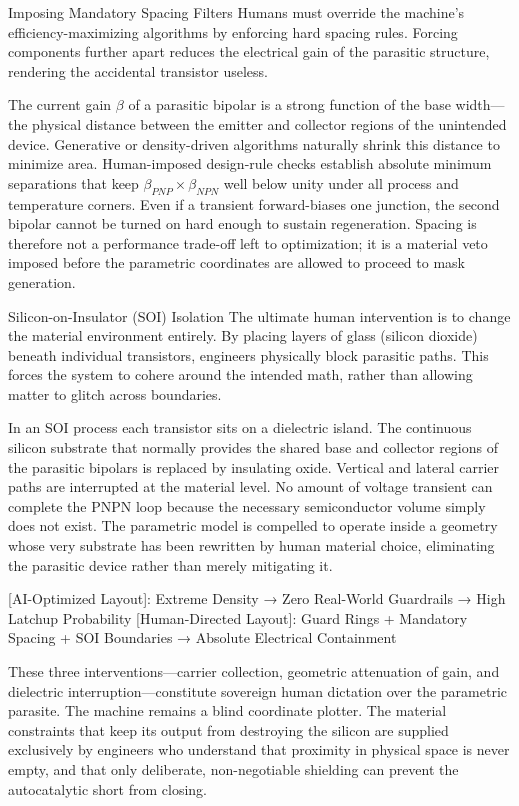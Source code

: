 Imposing Mandatory Spacing Filters  
Humans must override the machine’s efficiency-maximizing algorithms by enforcing hard spacing rules. Forcing components further apart reduces the electrical gain of the parasitic structure, rendering the accidental transistor useless.  

The current gain \(\beta\) of a parasitic bipolar is a strong function of the base width—the physical distance between the emitter and collector regions of the unintended device. Generative or density-driven algorithms naturally shrink this distance to minimize area. Human-imposed design-rule checks establish absolute minimum separations that keep \(\beta_{PNP} \times \beta_{NPN}\) well below unity under all process and temperature corners. Even if a transient forward-biases one junction, the second bipolar cannot be turned on hard enough to sustain regeneration. Spacing is therefore not a performance trade-off left to optimization; it is a material veto imposed before the parametric coordinates are allowed to proceed to mask generation.

Silicon-on-Insulator (SOI) Isolation  
The ultimate human intervention is to change the material environment entirely. By placing layers of glass (silicon dioxide) beneath individual transistors, engineers physically block parasitic paths. This forces the system to cohere around the intended math, rather than allowing matter to glitch across boundaries.  

In an SOI process each transistor sits on a dielectric island. The continuous silicon substrate that normally provides the shared base and collector regions of the parasitic bipolars is replaced by insulating oxide. Vertical and lateral carrier paths are interrupted at the material level. No amount of voltage transient can complete the PNPN loop because the necessary semiconductor volume simply does not exist. The parametric model is compelled to operate inside a geometry whose very substrate has been rewritten by human material choice, eliminating the parasitic device rather than merely mitigating it.

[AI-Optimized Layout]:   Extreme Density → Zero Real-World Guardrails → High Latchup Probability
[Human-Directed Layout]: Guard Rings + Mandatory Spacing + SOI Boundaries → Absolute Electrical Containment

These three interventions—carrier collection, geometric attenuation of gain, and dielectric interruption—constitute sovereign human dictation over the parametric parasite. The machine remains a blind coordinate plotter. The material constraints that keep its output from destroying the silicon are supplied exclusively by engineers who understand that proximity in physical space is never empty, and that only deliberate, non-negotiable shielding can prevent the autocatalytic short from closing.

